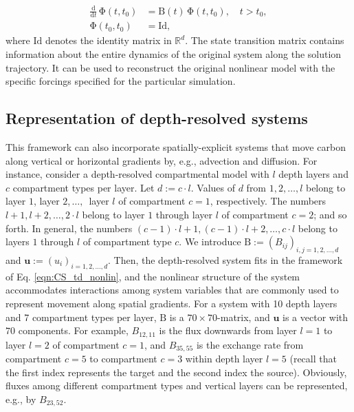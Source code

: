 \documentclass[draft]{agujournal2019}
\renewcommand{\vec}[1]{\mathbf{#1}}
\newcommand{\tens}[1]{\mathrm{#1}}
\newcommand{\id}{\tens{Id}}
\newcommand{\deriv}[1]{\frac{\mathrm{d}}{\mathrm{d}#1}}
\newcommand{\R}{\mathbb{R}}
\begin{document}
    \begin{equation*}
        \begin{aligned}
            \deriv{t}\,\tens{\Phi}(t,t_0) &= \tens{B}(t)\,\tens{\Phi}(t,t_0),\quad t>t_0,\\
            \tens{\Phi}(t_0,t_0) &= \id,
        \end{aligned}
    \end{equation*}
    where $\id$ denotes the identity matrix in $\R^d$. The state transition matrix contains information about the entire dynamics of the original system along the solution trajectory. It can be used to reconstruct the original nonlinear model with the specific forcings specified for the particular simulation. 

\subsection{Representation of depth-resolved systems}
    This framework can also incorporate spatially-explicit systems that move carbon along vertical or horizontal gradients by, e.g., advection and diffusion.  For instance, consider a depth-resolved compartmental model with $l$ depth layers and $c$ compartment types per layer.
    Let $d:=c \cdot l$. 
    Values of $d$ from $1,2, \ldots, l$  belong to layer $1$, layer $2$,$\,\ldots,\,$ layer $l$ of compartment $c =  1$, respectively.
    The numbers $l+1,l+2,\ldots,2 \cdot l$ belong to layer $1$ through layer $l$ of compartment $c = 2$; and so forth.
    In general, the numbers $(c-1) \cdot l+1,(c-1) \cdot l+2,\ldots,c \cdot l$ belong to layers $1$ through $l$ of compartment type $c$.
    We introduce $\tens{B}:=(B_{ij})_{i,j=1,2,\ldots,d}$ and $\vec{u}:=(u_i)_{i=1,2,\ldots,d}$.
    Then, the depth-resolved system fits in the framework of Eq. \eqref{eqn:CS_td_nonlin}, and the nonlinear structure of the system accommodates interactions among system variables that are commonly used to represent movement along spatial gradients.
    For a system with 10 depth layers and 7 compartment types per layer, $\tens{B}$ is a $70\times 70$-matrix, and $\vec{u}$ is a vector with $70$ components.
    For example, $B_{12,11}$ is the flux downwards from layer $l = 1$ to layer $l = 2$ of compartment $c = 1$, and $B_{35,55}$ is the exchange rate from compartment $c = 5$  to compartment $c = 3$ within depth layer $l = 5$ (recall that the first index represents the target and the second index the source).
    Obviously,  fluxes among different compartment types and vertical layers can be represented, e.g., by $B_{23,52}$. 
\end{document}
